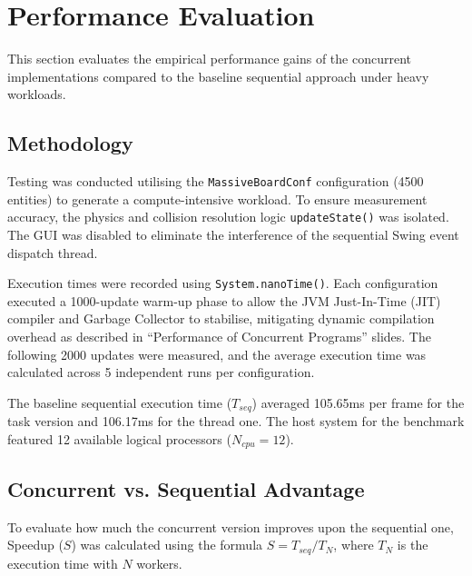 \documentclass{scrartcl}
\begin{document}
\section{Performance Evaluation}
This section evaluates the empirical performance gains of the concurrent implementations compared to the baseline sequential approach under heavy workloads.

\subsection{Methodology}
Testing was conducted utilising the \texttt{MassiveBoardConf} configuration (4500 entities) to generate a compute-intensive workload. To ensure measurement accuracy, the physics and collision resolution logic \texttt{updateState()} was isolated. The GUI was disabled to eliminate the interference of the sequential Swing event dispatch thread.

Execution times were recorded using \texttt{System.nanoTime()}. Each configuration executed a 1000-update warm-up phase to allow the JVM Just-In-Time (JIT) compiler and Garbage Collector to stabilise, mitigating dynamic compilation overhead as described in ``Performance of Concurrent Programs'' slides. The following 2000 updates were measured, and the average execution time was calculated across 5 independent runs per configuration.

The baseline sequential execution time ($T_{seq}$) averaged 105.65ms per frame for the task version and 106.17ms for the thread one. The host system for the benchmark featured 12 available logical processors ($N_{cpu} = 12$).

\subsection{Concurrent vs. Sequential Advantage}
To evaluate how much the concurrent version improves upon the sequential one, Speedup ($S$) was calculated using the formula $S = T_{seq} / T_N$, where $T_N$ is the execution time with $N$ workers.
\end{document}
